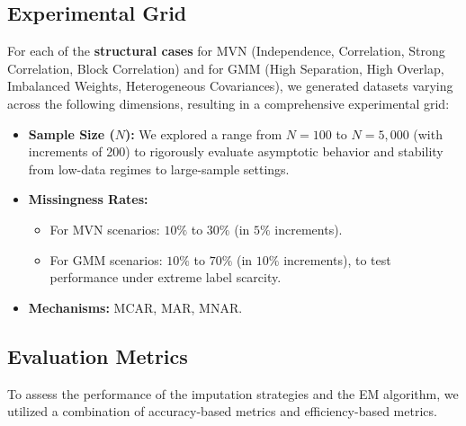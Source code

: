 \documentclass[11pt, a4paper]{article}
\begin{document}
\subsection{Experimental Grid}
For each of the \textbf{structural cases} for MVN (Independence, Correlation, Strong Correlation, Block Correlation) and for GMM (High Separation, High Overlap, Imbalanced Weights, Heterogeneous Covariances), we generated datasets varying across the following dimensions, resulting in a comprehensive experimental grid:
\begin{itemize}
    \item \textbf{Sample Size ($N$):} We explored a range from $N=100$ to $N=5,000$ (with increments of 200) to rigorously evaluate asymptotic behavior and stability from low-data regimes to large-sample settings.
    \item \textbf{Missingness Rates:} 
    \begin{itemize}
        \item For MVN scenarios: $10\%$ to $30\%$ (in $5\%$ increments).
        \item For GMM scenarios: $10\%$ to $70\%$ (in $10\%$ increments), to test performance under extreme label scarcity.
    \end{itemize}
    \item \textbf{Mechanisms:} MCAR, MAR, MNAR.
\end{itemize}

\subsection{Evaluation Metrics}

To assess the performance of the imputation strategies and the EM algorithm, we utilized a combination of accuracy-based metrics and efficiency-based metrics.
\end{document}
